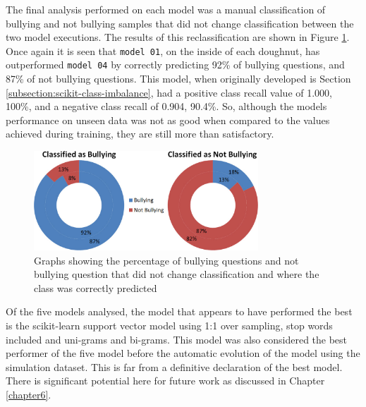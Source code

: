 The final analysis performed on each model was a manual classification of bullying and not bullying samples that did not change classification between the two model executions. The results of this reclassification are shown in Figure \ref{fig:manual_classification}. Once again it is seen that \verb|model 01|, on the inside of each doughnut, has outperformed \verb|model 04| by correctly predicting 92\% of bullying questions, and 87\% of not bullying questions. This model, when originally developed is Section \ref{subsection:scikit-class-imbalance}, had a positive class recall value of 1.000, 100\%, and a negative class recall of 0.904, 90.4\%. So, although the models performance on unseen data was not as good when compared to the values achieved during training, they are still more than satisfactory. 

\begin{figure}[htbp]
	\centering
	\includegraphics[width=0.75\textwidth]{Figures/Chapter5/manual_classification.jpg}
	\caption[Sample analysis of samples that did not change classification]{Graphs showing the percentage of bullying questions and not bullying question that did not change classification and where the class was correctly predicted}
	\label{fig:manual_classification}
\end{figure}

Of the five models analysed, the model that appears to have performed the best is the scikit-learn support vector model using 1:1 over sampling, stop words included and uni-grams and bi-grams. This model was also considered the best performer of the five model before the automatic evolution of the model using the simulation dataset. This is far from a definitive declaration of the best model. There is significant potential here for future work as discussed in Chapter \ref{chapter6}.
